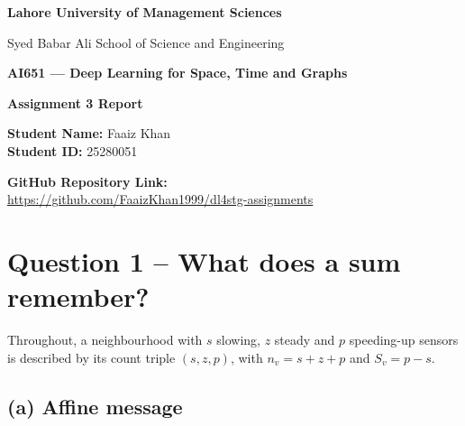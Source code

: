 \documentclass[11pt, a4paper]{article}
\begin{document}
\begin{titlepage}
    \centering
    \vspace*{2cm}
    
    {\LARGE \textbf{Lahore University of Management Sciences} \par}
    \vspace{0.5cm}
    {\Large Syed Babar Ali School of Science and Engineering \par}
    
    \vfill
    
    {\Large \textbf{AI651 --- Deep Learning for Space, Time and Graphs} \par}
    \vspace{1cm}
    {\Huge \textbf{Assignment 3 Report} \par}
    
    \vfill
    
    {\Large 
        \textbf{Student Name:} Faaiz Khan \\[0.2cm]
        \textbf{Student ID:} 25280051 
    \par}
    
    \vspace{1.5cm}
    
    {\large \textbf{GitHub Repository Link:}\\
    \vspace{0.2cm}
    \url{https://github.com/FaaizKhan1999/dl4stg-assignments} \par}
    
    \vspace*{2cm}
\end{titlepage}

\section*{Question 1 -- What does a sum remember?}

Throughout, a neighbourhood with $s$ slowing, $z$ steady and $p$ speeding-up sensors is described by its count triple $(s, z, p)$, with $n_v = s + z + p$ and $S_v = p - s$.

\subsection*{(a) Affine message}
\end{document}

